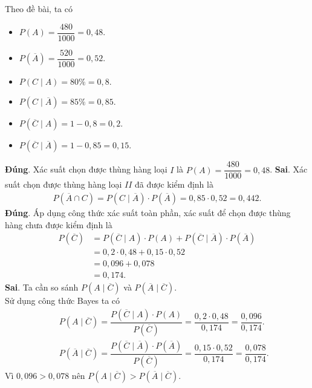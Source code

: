\begin{ex}
{\begin{center}
		\end{center}
		Theo đề bài, ta  có
		\begin{itemize}
			\item  $P(A)=\dfrac{480}{1000}=0{,}48$.
			\item $P(\overline{A})=\dfrac{520}{1000}=0{,}52$. 
			\item  $P(C\mid A)=80\%=0{,}8$.
			 \item $P(C\mid \overline{A})=85\%=0{,}85$.
			\item  $P(\overline{C}\mid A)=1-0{,}8=0{,}2$.
			\item  $P(\overline{C}\mid \overline{A})=1-0{,}85=0{,}15$.
		\end{itemize}
		\begin{itemchoice}
			\itemch \textbf{Đúng}. Xác suất chọn được thùng hàng loại $I$ là  $P(A)=\dfrac{480}{1000}=0{,}48$.
			\itemch \textbf{Sai}. Xác suất chọn được thùng hàng loại $II$  đã được kiểm định là
			\begin{eqnarray*}
				P(\overline{A}\cap C)=P(C\mid  \overline{A})\cdot P(\overline{A})=0{,}85\cdot0{,}52=0{,}442.
			\end{eqnarray*}
			\itemch \textbf{Đúng}. Áp dụng công thức xác suất toàn phần, xác  suất để chọn được thùng hàng chưa được kiểm định là
			\begin{align*}
				P(\overline{C}) &= P(\overline{C}\mid A) \cdot P(A) +  P(\overline{C}\mid \overline{A}) \cdot P(\overline{A}) \\
				 &= 0{,}2 \cdot 0{,}48 + 0{,}15 \cdot 0{,}52 \\
				 &= 0{,}096 + 0{,}078 \\
				 &= 0{,}174.
			\end{align*}
			\itemch \textbf{Sai}. Ta cần so sánh $P(A\mid\overline{C})$  và $P(\overline{A}\mid\overline{C})$.\\
			Sử dụng công thức Bayes ta có 
			\begin{eqnarray*}
				&&P(A\mid  \overline{C})=\dfrac{P(\overline{C}\mid A)\cdot P(A)}{P(\overline{C})}=\dfrac{0{,}2\cdot0{,}48}{0{,}174}=\dfrac{0{,}096}{0{,}174}.\\
				&&P(\overline{A}\mid \overline{C})=\dfrac{P(\overline{C}\mid  \overline{A})\cdot P(\overline{A})}{P(\overline{C})}=\dfrac{0{,}15\cdot0{,}52}{0{,}174}=\dfrac{0{,}078}{0{,}174}.
			\end{eqnarray*}
			Vì $0{,}096>0{,}078$  nên $P(A\mid\overline{C})>P(\overline{A}\mid\overline{C})$.
		\end{itemchoice}
	 }
\end{ex}


